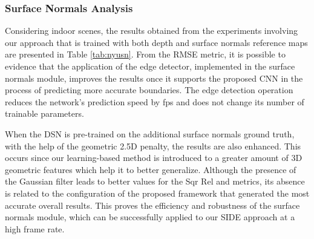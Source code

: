 \documentclass[5p]{elsarticle}
\begin{document}
\subsubsection{Surface Normals Analysis}

Considering indoor scenes, the results obtained from the experiments involving our approach that is trained with both depth and surface normals reference maps are presented in Table \ref{tab:nyusn}. From the RMSE metric, it is possible to evidence that the application of the edge detector, implemented in the surface normals module, improves the results once it supports the proposed CNN in the process of predicting more accurate boundaries. The edge detection operation reduces the network's prediction speed by  fps and does not change its number of trainable parameters.

When the DSN  is pre-trained on the additional surface normals ground truth, with the help of the geometric 2.5D penalty, the results are also enhanced. This occurs since our learning-based method is introduced to a greater amount of 3D geometric features which help it to better generalize. Although the presence of the Gaussian filter leads to better values for the Sqr Rel and  metrics, its absence is related to the configuration of the proposed framework that generated the most accurate overall results. This proves the efficiency and robustness of the surface normals module, which can be successfully applied to our SIDE approach at a high frame rate. 
\end{document}
